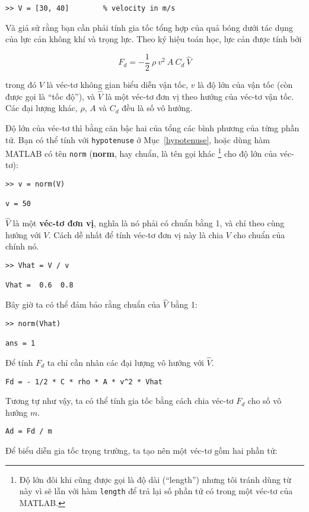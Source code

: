 \documentclass[12pt]{book}
\begin{document}
\begin{verbatim}
>> V = [30, 40]        % velocity in m/s
\end{verbatim}
%
Và giả sử rằng bạn cần phải tính gia tốc tổng hợp của quả bóng dưới tác 
dụng của lực cản không khí và trọng lực. Theo ký hiệu toán học, lực cản 
được tính bởi 

\[ F_d = -\frac{1}{2} ~ \rho ~ v^2 ~ A ~ C_d ~ \hat{V}   \]

trong đó  $V$ là véc-tơ không gian biểu diễn vận tốc, $v$ là độ lớn của 
vận tốc (còn được gọi là  ``tốc độ''), và $\hat{V}$ là một véc-tơ đơn vị 
theo hướng của véc-tơ vận tốc. Các đại lượng khác, $\rho$, $A$ và  $C_d$
đều là số vô hướng.

Độ lớn của véc-tơ thì bằng căn bậc hai của tổng các bình phương 
của từng phần tử. Bạn có thể tính với {\tt hypotenuse} ở Mục~\ref{hypotenuse}, 
hoặc dùng hàm MATLAB có tên {\tt norm} ({\bf norm}, hay chuẩn, là 
tên gọi khác \footnote{Độ lớn đôi khi cũng được gọi là độ dài 
(``length'') nhưng tôi tránh dùng từ này vì sẽ lẫn với hàm 
{\tt length} để trả lại số phần tử có trong một véc-tơ của MATLAB.}  cho độ lớn của véc-tơ):

\begin{verbatim}
>> v = norm(V)

v = 50
\end{verbatim}
%
$\hat{V}$ là một {\bf véc-tơ đơn vị}, nghĩa là nó phải có chuẩn bằng 1,
và  chỉ theo cùng hướng với $V$.  Cách dễ nhất để tính véc-tơ đơn vị này là chia 
$V$ cho chuẩn của chính nó.

\begin{verbatim}
>> Vhat = V / v

Vhat =  0.6  0.8
\end{verbatim}
%
Bây giờ ta có thể đảm bảo rằng chuẩn của $\hat{V}$ bằng 1:

\begin{verbatim}
>> norm(Vhat)

ans = 1
\end{verbatim}
%
Để tính $F_d$ ta chỉ cần nhân các đại lượng vô hướng với $\hat{V}$.

\begin{verbatim}
Fd = - 1/2 * C * rho * A * v^2 * Vhat
\end{verbatim}
%
Tương tự như vậy, ta có thể tính gia tốc bằng cách chia véc-tơ 
$F_d$ cho số vô hướng $m$.

\begin{verbatim}
Ad = Fd / m
\end{verbatim}
%
Để biểu diễn gia tốc trọng trường, ta tạo nên một véc-tơ gồm hai 
phần tử:
\end{document}
